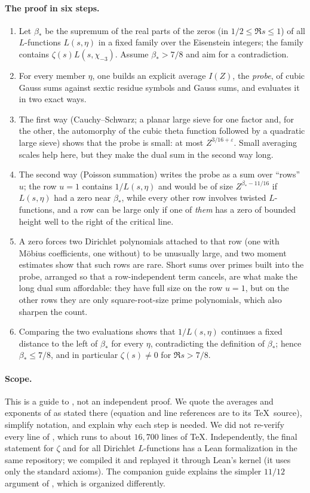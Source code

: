 \documentclass[11pt]{article}
\begin{document}
\paragraph{The proof in six steps.}
\begin{enumerate}
\item Let $\beta_*$ be the supremum of the real parts of the zeros (in
 $1/2\le\Re s\le1$) of all $L$-functions $L(s,\eta)$ in a fixed family over the
 Eisenstein integers; the family contains $\zeta(s)L(s,\chi_{-3})$. Assume
 $\beta_*>7/8$ and aim for a contradiction.
\item For every member $\eta$, one builds an explicit average $I(Z)$, the
 \emph{probe}, of cubic Gauss sums against sextic residue symbols and
 Gauss sums, and evaluates it in two exact ways.
\item The first way (Cauchy--Schwarz; a planar large sieve for one factor and,
 for the other, the automorphy of the cubic theta function followed by a
 quadratic large sieve) shows that the probe is small: at most
 $Z^{3/16+\varepsilon}$. Small averaging scales help here, but they make the
 dual sum in the second way long.
\item The second way (Poisson summation) writes the probe as a sum over
 ``rows'' $u$; the row $u=1$ contains $1/L(s,\eta)$ and would be of size
 $Z^{\beta_*-11/16}$ if $L(s,\eta)$ had a zero near $\beta_*$, while every
 other row involves twisted $L$-functions, and a row can be large only if one
 of \emph{them} has a zero of bounded height well to the right of the critical line.
\item A zero forces two Dirichlet polynomials attached to that row (one with
 M\"obius coefficients, one without) to be unusually large, and two moment
 estimates show that such rows are rare. Short sums over primes built into
 the probe, arranged so that a row-independent term cancels, are what make the
 long dual sum affordable: they have full size on the row $u=1$, but on the other
 rows they are only square-root-size prime polynomials, which also sharpen the count.
\item Comparing the two evaluations shows that $1/L(s,\eta)$ continues a
 fixed distance to the left of $\beta_*$ for every $\eta$, contradicting
 the definition of $\beta_*$; hence $\beta_*\le7/8$, and in particular
 $\zeta(s)\ne0$ for $\Re s>7/8$.
\end{enumerate}

\paragraph{Scope.}
This is a guide to \cite{OAI78}, not an independent proof. We quote the
averages and exponents of \cite{OAI78} as stated there (equation and
line references are to its \TeX\ source), simplify notation, and explain
why each step is needed. We did not re-verify every line of
\cite{OAI78}, which runs to about $16{,}700$ lines of \TeX. Independently, the final statement for
$\zeta$ and for all Dirichlet $L$-functions has a Lean formalization in the
same repository; we compiled it and replayed it through Lean's kernel
(it uses only the standard axioms). The companion guide \cite{guide1112}
explains the simpler $11/12$ argument of \cite{OAI1112}, which is organized
differently.
\end{document}
